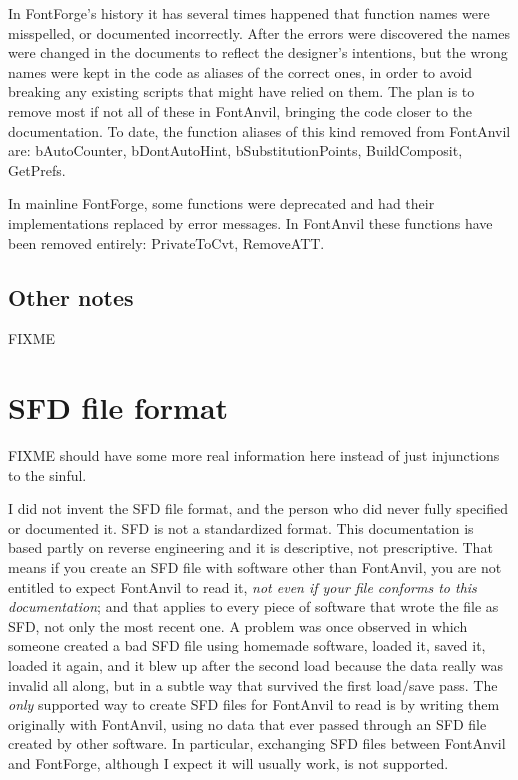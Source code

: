 \documentclass[11pt]{report}
\begin{document}
In FontForge's history it has several times happened that function names
were misspelled, or documented incorrectly.  After the errors were
discovered the names were changed in the documents to reflect the designer's
intentions, but the wrong names were kept in the code as aliases of the
correct ones, in order to avoid breaking any existing scripts that might
have relied on them.  The plan is to remove most if not all of these in
FontAnvil, bringing the code closer to the documentation.  To date, the
function aliases of this kind removed from FontAnvil are: bAutoCounter,
bDontAutoHint, bSubstitutionPoints, BuildComposit, GetPrefs.

In mainline FontForge, some functions were deprecated and had their
implementations replaced by error messages.  In FontAnvil these functions
have been removed entirely:  PrivateToCvt, RemoveATT.

\section{Other notes}

FIXME

\clearpage

\iffalse
\chapter{SFD file format}

FIXME should have some more real information here instead of just
injunctions to the sinful.

\begin{framed}
I did not invent the SFD file format, and the person who did never fully
specified or documented it.  SFD is not a standardized format.  This
documentation is based partly on reverse engineering and it is descriptive,
not prescriptive.  That means if you create an SFD file with software other
than FontAnvil, you are not entitled to expect FontAnvil to read it,
\emph{not even if your file conforms to this documentation}; and that
applies to every piece of software that wrote the file as SFD,
not only the most recent one.  A problem was once observed in which
someone created a bad SFD file using homemade software, loaded it, saved
it, loaded it again, and it blew up after the second load because the data
really was invalid all along, but in a subtle way that survived
the first load/save pass.  The \emph{only}
supported way to create SFD files for FontAnvil to read is by writing them
originally with FontAnvil, using no data that ever passed through an SFD
file created by other software.  In particular, exchanging SFD files
between FontAnvil and FontForge, although I expect it will usually work,
is not supported.
\end{framed}
\end{document}
